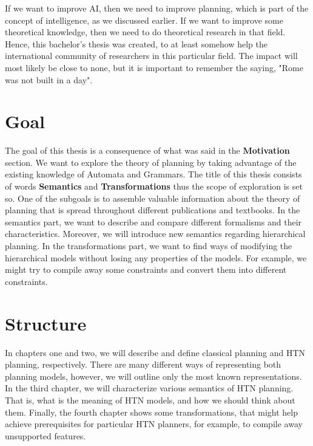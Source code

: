 \medskip\noindent
If we want to improve AI, then we need to improve planning, which is part of the concept of intelligence, as we discussed earlier. If we want to improve some theoretical knowledge, then we need to do theoretical research in that field. Hence, this bachelor's thesis was created, to at least somehow help the international community of researchers in this particular field. The impact will most likely be close to none, but it is important to remember the saying, "Rome was not built in a day".

\section*{Goal}

\noindent
The goal of this thesis is a consequence of what was said in the \textbf{Motivation} section. We want to explore the theory of planning by taking advantage of the existing knowledge of Automata and Grammars. The title of this thesis consists of words \textbf{Semantics} and \textbf{Transformations} thus the scope of exploration is set so. One of the subgoals is to assemble valuable information about the theory of planning that is spread throughout different publications and textbooks. In the semantics part, we want to describe and compare different formalisms and their characteristics.
Moreover, we will introduce new semantics regarding hierarchical planning. In the transformations part, we want to find ways of modifying the hierarchical models without losing any properties of the models. For example, we might try to compile away some constraints and convert them into different constraints.

\section*{Structure}

\noindent
In chapters one and two, we will describe and define classical planning and HTN planning, respectively. There are many different ways of representing both planning models, however, we will outline only the most known representations. In the third chapter, we will characterize various semantics of HTN planning. That is, what is the meaning of HTN models, and how we should think about them. Finally, the fourth chapter shows some transformations, that might help achieve prerequisites for particular HTN planners, for example, to compile away unsupported features.